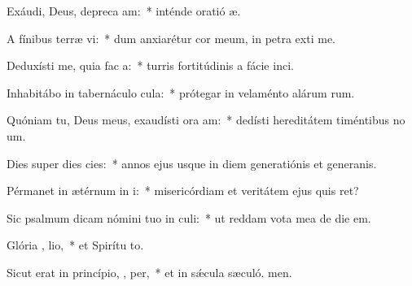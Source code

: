\item Exáudi, Deus, depreca am:~* inténde oratió æ.
\item A fínibus terræ   vi:~* dum anxiarétur cor meum, in petra exti me.
\item Deduxísti me, quia fac   a:~* turris fortitúdinis a fácie inci.
\item Inhabitábo in tabernáculo   cula:~* prótegar in velaménto alárum rum.
\item Quóniam tu, Deus meus, exaudísti ora am:~* dedísti hereditátem timéntibus no um.
\item Dies super dies  cies:~* annos ejus usque in diem generatiónis et generanis.
\item Pérmanet in ætérnum in  i:~* misericórdiam et veritátem ejus quis ret?
\item Sic psalmum dicam nómini tuo in  culi:~* ut reddam vota mea de die  em.
\item Glória ,  lio,~* et Spirítu to.
\item Sicut erat in princípio,  ,  per,~* et in sǽcula sæculó. men.
